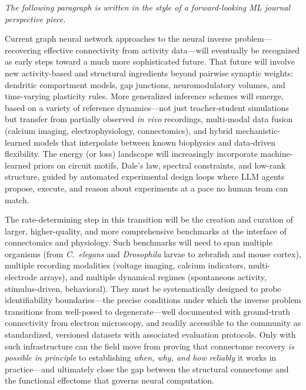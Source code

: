 \documentclass[11pt,twocolumn]{article}
\begin{document}
\vspace{0.2cm}

\noindent\textit{The following paragraph is written in the style of a forward-looking ML journal perspective piece.}

\vspace{0.3cm}

\noindent Current graph neural network approaches to the neural inverse problem---recovering effective connectivity from activity data---will eventually be recognized as early steps toward a much more sophisticated future. That future will involve new activity-based and structural ingredients beyond pairwise synaptic weights: dendritic compartment models, gap junctions, neuromodulatory volumes, and time-varying plasticity rules. More generalized inference schemes will emerge, based on a variety of reference dynamics---not just teacher-student simulations but transfer from partially observed \emph{in vivo} recordings, multi-modal data fusion (calcium imaging, electrophysiology, connectomics), and hybrid mechanistic-learned models that interpolate between known biophysics and data-driven flexibility. The energy (or loss) landscape will increasingly incorporate machine-learned priors on circuit motifs, Dale's law, spectral constraints, and low-rank structure, guided by automated experimental design loops where LLM agents propose, execute, and reason about experiments at a pace no human team can match.

The rate-determining step in this transition will be the creation and curation of larger, higher-quality, and more comprehensive benchmarks at the interface of connectomics and physiology. Such benchmarks will need to span multiple organisms (from \textit{C.~elegans} and \textit{Drosophila} larvae to zebrafish and mouse cortex), multiple recording modalities (voltage imaging, calcium indicators, multi-electrode arrays), and multiple dynamical regimes (spontaneous activity, stimulus-driven, behavioral). They must be systematically designed to probe identifiability boundaries---the precise conditions under which the inverse problem transitions from well-posed to degenerate---well documented with ground-truth connectivity from electron microscopy, and readily accessible to the community as standardized, versioned datasets with associated evaluation protocols. Only with such infrastructure can the field move from proving that connectome recovery \emph{is possible in principle} to establishing \emph{when, why, and how reliably} it works in practice---and ultimately close the gap between the structural connectome and the functional effectome that governs neural computation.
\end{document}
